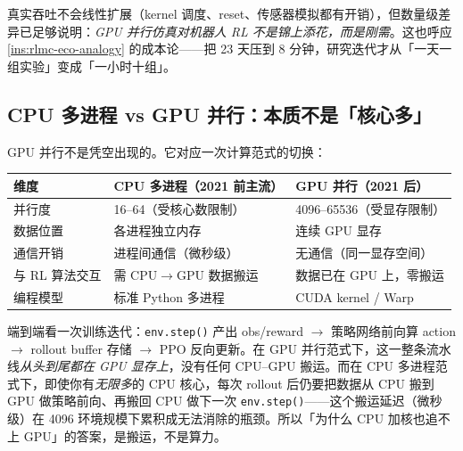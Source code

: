 真实吞吐不会线性扩展（kernel 调度、reset、传感器模拟都有开销），但数量级差异已足够说明：\emph{GPU 并行仿真对机器人 RL 不是锦上添花，而是刚需}。这也呼应 \cref{ins:rlmc-eco-analogy} 的成本论——把 23 天压到 8 分钟，研究迭代才从「一天一组实验」变成「一小时十组」。

\subsection{CPU 多进程 vs GPU 并行：本质不是「核心多」}

GPU 并行不是凭空出现的。它对应一次计算范式的切换：

\begin{center}
\small
\begin{tabular}{@{}lll@{}}
\toprule
维度 & CPU 多进程（2021 前主流） & GPU 并行（2021 后） \\
\midrule
并行度 & 16--64（受核心数限制） & 4096--65536（受显存限制） \\
数据位置 & 各进程独立内存 & 连续 GPU 显存 \\
通信开销 & 进程间通信（微秒级） & 无通信（同一显存空间） \\
与 RL 算法交互 & 需 CPU$\to$GPU 数据搬运 & 数据已在 GPU 上，零搬运 \\
编程模型 & 标准 Python 多进程 & CUDA kernel / Warp \\
\bottomrule
\end{tabular}
\end{center}

\begin{insight}\label{ins:rlmc-eco-zerocopy}
端到端看一次训练迭代：\verb|env.step()| 产出 obs/reward $\to$ 策略网络前向算 action $\to$ rollout buffer 存储 $\to$ PPO 反向更新。在 GPU 并行范式下，这一整条流水线\emph{从头到尾都在 GPU 显存上}，没有任何 CPU--GPU 搬运。而在 CPU 多进程范式下，即使你有\emph{无限多}的 CPU 核心，每次 rollout 后仍要把数据从 CPU 搬到 GPU 做策略前向、再搬回 CPU 做下一次 \verb|env.step()|——这个搬运延迟（微秒级）在 4096 环境规模下累积成无法消除的瓶颈。所以「为什么 CPU 加核也追不上 GPU」的答案，是搬运，不是算力。
\end{insight}

